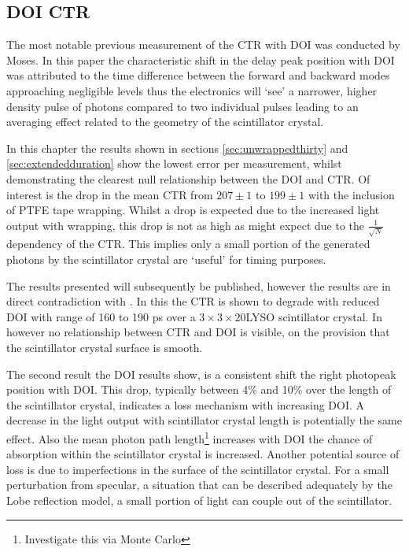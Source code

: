 \subsection{DOI CTR}
The most notable previous measurement of the CTR with DOI was conducted by Moses\cite{Moses1999}. In this paper the characteristic shift in the delay peak position with DOI was attributed to the time difference between the forward and backward modes approaching negligible levels thus the electronics will `see' a narrower, higher density pulse of photons compared to two individual pulses leading to an averaging effect related to the geometry of the scintillator crystal. 

In this chapter the results shown in sections \ref{sec:unwrappedthirty} and \ref{sec:extendedduration} show the lowest error per measurement, whilst demonstrating the clearest null relationship between the DOI and CTR.  Of interest is the drop in the mean CTR from $207\pm1$ to $199\pm1$ with the inclusion of PTFE tape wrapping. Whilst a drop is expected due to the increased light output with wrapping, this drop is not as high as might expect due to the $\frac{1}{\sqrt{N}}$ dependency of the CTR. This implies only a small portion of the generated photons by the scintillator crystal are `useful' for timing purposes.

The results presented will subsequently be published, however the results are in direct contradiction with \cite{Yeom2013}. In this the CTR is shown to degrade with reduced DOI with range of 160 to 190 ps over a $3\times3\times20$\mmc LYSO scintillator crystal. In \cite{Bircher2012} however no relationship between CTR and DOI is visible, on the provision that the scintillator crystal surface is smooth.

The second result the DOI results show, is a consistent shift the right photopeak position with DOI. This drop, typically between 4\% and 10\% over the length of the scintillator crystal, indicates a loss mechanism with increasing DOI. A decrease in the light output with scintillator crystal length\cite{Moszyixki1997} is potentially the same effect. Also the mean photon path length\footnote{Investigate this via Monte Carlo} increases with DOI the chance of absorption within the scintillator crystal is increased. Another potential source of loss is due to imperfections in the surface of the scintillator crystal. For a small perturbation from specular, a situation that can be described adequately by the Lobe reflection model\cite{Janecek2010a}, a small portion of light can couple out of the scintillator.